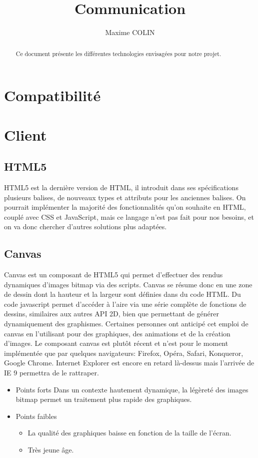 \documentclass[a4paper,10pt]{report}
\title{Communication}
\author{Maxime COLIN}
\begin{document}
\maketitle

\begin{abstract}
Ce document présente les différentes technologies envisagées pour notre projet.
\end{abstract}


\chapter{Compatibilité}


\chapter{Client}




\section{HTML5}
HTML5 est la dernière version de HTML, il introduit dans ses spécifications plusieurs 
balises, 
de nouveaux types et attributs pour les anciennes balises. 
On pourrait implémenter la majorité des fonctionnalités qu'on souhaite en HTML, couplé 
avec CSS et JavaScript, mais ce langage n'est pas fait pour nos besoins, et on va donc 
chercher d'autres solutions plus adaptées. 

\section{Canvas}
Canvas est un composant de HTML5 qui permet d'effectuer des rendus dynamiques d'images 
bitmap via des scripts.
Canvas se résume donc en une zone de dessin dont la hauteur et la largeur sont définies 
dans du code HTML. Du code javascript permet d'accéder à l'aire via une série complète de fonctions de dessins, 
similaires aux autres API 2D, bien que permettant de générer dynamiquement des graphismes. Certaines personnes ont anticipé cet emploi de canvas en l'utilisant pour des graphiques, des animations et de la création d'images.
Le composant canvas est plutôt récent et n'est pour le moment implémentée que par 
quelques navigateurs: Firefox, Opéra, Safari, Konqueror, Google Chrome. 
Internet Explorer est encore en retard là-dessus mais l'arrivée de IE 9 permettra
 de le rattraper.

\begin{itemize}
  \item{Points forts}
Dans un contexte hautement dynamique, la légèreté des images bitmap permet un traitement
 plus rapide des graphiques.
\item{Points faibles}
 \begin{itemize}
\item La qualité des graphiques baisse en fonction de la taille de l'écran.
\item Très jeune âge.
\end{itemize}
\end{itemize}
\end{document}
